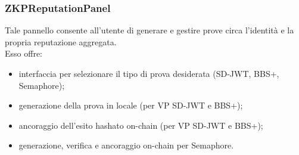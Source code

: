             \subsubsection{ZKPReputationPanel}
                \noindent Tale pannello consente all'utente di generare e gestire prove circa l'identità e la propria reputazione aggregata. \\
                Esso offre:
                    \begin{itemize}
                        \item interfaccia per selezionare il tipo di prova desiderata (SD-JWT, BBS+, Semaphore);
                        
                        \item generazione della prova in locale (per VP SD-JWT e BBS+);
                        
                        \item ancoraggio dell'esito hashato on-chain (per VP SD-JWT e BBS+);
                        
                        \item generazione, verifica e ancoraggio on-chain per Semaphore.
                    \end{itemize}

